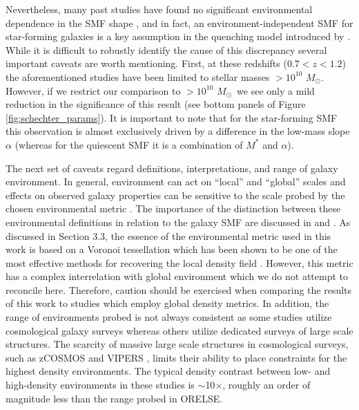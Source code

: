 \documentclass[a4paper,fleqn,usenatbib]{mnras}
\def\msol{$M_{\odot}$}
\begin{document}
Nevertheless, many past studies have found no significant environmental dependence in the SMF shape \citep{Peng2010, Bolzonella2010, Giodini2012, Vulcani2013, Calvi2013, vanderBurg2013}, and in fact, an environment-independent SMF for star-forming galaxies is a key assumption in the quenching model introduced by \citet{Peng2010}.
While it is difficult to robustly identify the cause of this discrepancy several important caveats are worth mentioning.
First, at these redshifts ($0.7 < z < 1.2$) the aforementioned studies have been limited to stellar masses $>10^{10}$ \msol .
However, if we restrict our comparison to $>10^{10}$ \msol\ we see only a mild reduction in the significance of this result (see bottom panels of Figure \ref{fig:schechter_params}).
It is important to note that for the star-forming SMF this observation is almost exclusively driven by a difference in the low-mass slope $\alpha$ (whereas for the quiescent SMF it is a combination of $M^*$ and $\alpha$).


The next set of caveats regard definitions, interpretations, and range of galaxy environment.
In general, environment can act on ``local'' and ``global'' scales and effects on observed galaxy properties can be sensitive to the scale probed by the chosen environmental metric \citep{Muldrew2012}.
The importance of the distinction between these environmental definitions in relation to the galaxy SMF are discussed in \citet{Vulcani2012} and \citet{Vulcani2013}.
As discussed in Section 3.3, the essence of the environmental metric used in this work is based on a Voronoi tessellation which has been shown to be one of the most effective methods for recovering the local density field \citep{Darvish2015}.
However, this metric has a complex interrelation with global environment \citep[e.g.][]{Weinmann2006, DeLucia2012, Hearin2016} which we do not attempt to reconcile here.
Therefore, caution should be exercised when comparing the results of this work to studies which employ global density metrics.
In addition, the range of environments probed is not always consistent as some studies utilize cosmological galaxy surveys whereas others utilize dedicated surveys of large scale structures.
The scarcity of massive large scale structures in cosmological surveys, such as zCOSMOS and VIPERS \citep{Bolzonella2010, Davidzon2016}, limits their ability to place constraints for the highest density environments.
The typical density contrast between low- and high-density environments in these studies is $\sim$10$\times$, roughly an order of magnitude less than the range probed in ORELSE.
\end{document}
